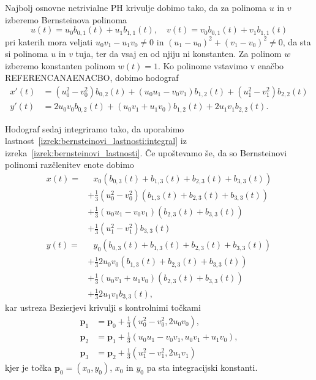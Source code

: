 \documentclass[isrm2, tisk]{fmfdelo}
\newcommand{\p}{\textbf{p}}
\begin{document}
    Najbolj osnovne netrivialne PH krivulje dobimo tako, da za polinoma $u$ in $v$ izberemo Bernsteinova polinoma
    \[u(t)=u_0b_{0,1}(t)+u_1b_{1,1}(t),\quad v(t)=v_0b_{0,1}(t)+v_1b_{1,1}(t)\]
    pri katerih mora veljati $u_0v_1-u_1v_0\neq 0$ in $(u_1-u_0)^2+(v_1-v_0)^2\neq 0$, da sta si polinoma $u$ in $v$ tuja, ter da vsaj en od njiju ni konstanten.
    Za polinom $w$ izberemo konstanten polinom $w(t)=1$.
    Ko polinome vstavimo v enačbo REFERENCANAENACBO, dobimo hodograf
    \begin{align*}
        x'(t) &=(u_0^2-v_0^2)b_{0,2}(t)+(u_0u_1-v_0v_1)b_{1,2}(t) + (u_1^2-v_1^2)b_{2,2}(t)\\
        y'(t) &= 2u_0 v_0 b_{0,2}(t)+(u_0v_1+u_1v_0)b_{1,2}(t)+2u_1 v_1 b_{2,2}(t).
    \end{align*}

    Hodograf sedaj integriramo tako, da uporabimo lastnost~\ref{izrek:bernsteinovi_lastnosti:integral} iz izreka~\ref{izrek:bernsteinovi_lastnosti}.
    Če upoštevamo še, da so Bernsteinovi polinomi razčlenitev enote dobimo
    \begin{align*}
        x(t) = &\ \ \ x_0(b_{0,3}(t) + b_{1,3}(t) + b_{2,3}(t)+ b_{3,3}(t)) \\
        &+ \frac{1}{3}(u_0^2-v_0^2)(b_{1,3}(t) + b_{2,3}(t)+ b_{3,3}(t)) \\
        &+ \frac{1}{3}(u_0u_1-v_0v_1)(b_{2,3}(t)+ b_{3,3}(t)) \\
        &+ \frac{1}{3} (u_1^2-v_1^2)b_{3,3}(t)\\
        y(t) = &\ \ \  y_0(b_{0,3}(t) + b_{1,3}(t) + b_{2,3}(t)+ b_{3,3}(t)) \\
        &+ \frac{1}{3}2u_0 v_0(b_{1,3}(t) + b_{2,3}(t)+ b_{3,3}(t)) \\
        &+ \frac{1}{3}(u_0v_1+u_1v_0)(b_{2,3}(t)+ b_{3,3}(t)) \\
        &+ \frac{1}{3} 2u_1 v_1 b_{3,3}(t),
    \end{align*}
    kar ustreza Bezierjevi krivulji s kontrolnimi točkami
    \begin{align}
        \p_1 &=\p_0+\frac{1}{3}(u_0^2-v_0^2,2u_0v_0), \nonumber\\
        \p_2 &= \p_1+\frac{1}{3}(u_0u_1-v_0v_1, u_0v_1+u_1v_0),\nonumber\\
        \p_3 &= \p_2 + \frac{1}{3}(u_1^2-v_1^2, 2u_1v_1) \label{eq:ph-kontrolne}
    \end{align}
    kjer je točka $\p_0=(x_0,y_0)$, $x_0$ in $y_0$ pa sta integracijski konstanti.
\end{document}
